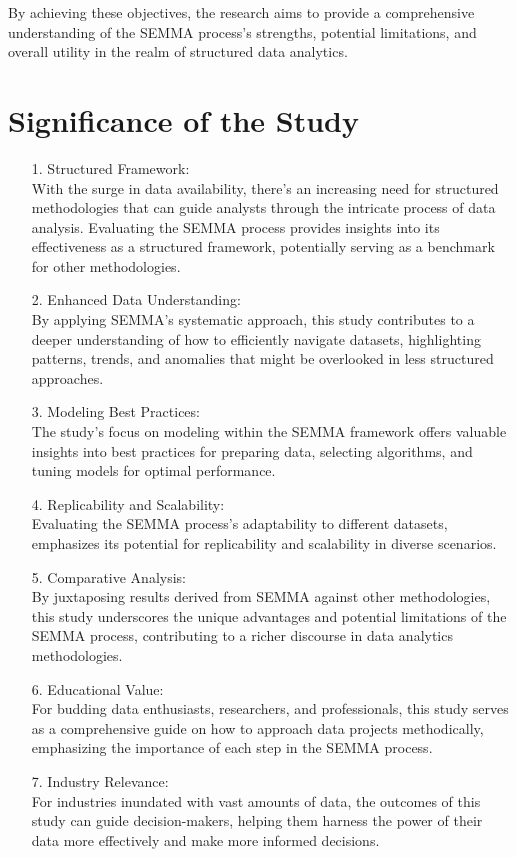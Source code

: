 \documentclass{article}
\begin{document}
By achieving these objectives, the research aims to provide a comprehensive understanding of the SEMMA process's strengths, potential limitations, and overall utility in the realm of structured data analytics.

\section{Significance of the Study}
\begin{itemize}
    \item[1.]Structured Framework:\\With the surge in data availability, there's an increasing need for structured methodologies that can guide analysts through the intricate process of data analysis. Evaluating the SEMMA process provides insights into its effectiveness as a structured framework, potentially serving as a benchmark for other methodologies.
    \item[2.] Enhanced Data Understanding:\\ By applying SEMMA's systematic approach, this study contributes to a deeper understanding of how to efficiently navigate datasets, highlighting patterns, trends, and anomalies that might be overlooked in less structured approaches.
    \item[3.] Modeling Best Practices: \\The study's focus on modeling within the SEMMA framework offers valuable insights into best practices for preparing data, selecting algorithms, and tuning models for optimal performance.
    \item[4.]Replicability and Scalability: \\Evaluating the SEMMA process's adaptability to different datasets, emphasizes its potential for replicability and scalability in diverse scenarios.
    \item[5.]Comparative Analysis:\\ By juxtaposing results derived from SEMMA against other methodologies, this study underscores the unique advantages and potential limitations of the SEMMA process, contributing to a richer discourse in data analytics methodologies.
    \item[6.]Educational Value: \\For budding data enthusiasts, researchers, and professionals, this study serves as a comprehensive guide on how to approach data projects methodically, emphasizing the importance of each step in the SEMMA process.
    \item[7.]Industry Relevance: \\For industries inundated with vast amounts of data, the outcomes of this study can guide decision-makers, helping them harness the power of their data more effectively and make more informed decisions.
\end{itemize}
\end{document}
